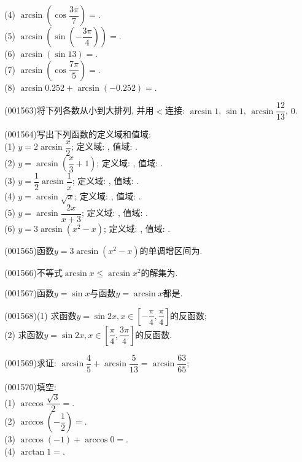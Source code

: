 (4) $\arcsin\left(\cos \dfrac{3\pi}{7}\right)=$.\\ 
(5) $\arcsin\left(\sin\left(-\dfrac{3\pi}{4}\right)\right)=$.\\ 
(6) $\arcsin\left(\sin 13\right)=$.\\ 
(7) $\arcsin\left(\cos \dfrac{7\pi}{5}\right)=$.\\ 
(8) $\arcsin 0.252+\arcsin(-0.252)=$.
\item (001563)将下列各数从小到大排列, 并用$<$连接: $\arcsin 1$, $\sin 1$, $\arcsin \dfrac{12}{13}$, $0$.\\ 
\item (001564)写出下列函数的定义域和值域:\\ 
(1) $y=2\arcsin \dfrac{x}{2}$; 定义域: , 值域: .\\ 
(2) $y=\arcsin\left(\dfrac{x}{3}+1\right)$; 定义域: , 值域: .\\ 
(3) $y=\dfrac{1}{2}\arcsin \dfrac{1}{x}$; 定义域: , 值域: .\\ 
(4) $y=\arcsin \sqrt{x}$; 定义域: , 值域: .\\ 
(5) $y=\arcsin \dfrac{2x}{x+3}$; 定义域: , 值域: .\\ 
(6) $y=3\arcsin (x^2-x)$; 定义域: , 值域: .
\item (001565)函数$y=3\arcsin (x^2-x)$的单调增区间为.
\item (001566)不等式$\arcsin x\le \arcsin x^2$的解集为.
\item (001567)函数$y=\sin x$与函数$y=\arcsin x$都是.
\item (001568)(1) 求函数$y=\sin 2x, x\in\left[-\dfrac{\pi}{4},\dfrac{\pi}{4}\right]$的反函数;\\ 
(2) 求函数$y=\sin 2x, x\in\left[\dfrac{\pi}{4},\dfrac{3\pi}{4}\right]$的反函数.
\item (001569)求证: $\arcsin \dfrac{4}{5}+\arcsin \dfrac{5}{13}=\arcsin \dfrac{63}{65}$;
\item (001570)填空:\\ 
(1) $\arccos\dfrac{\sqrt{3}}{2}=$.\\ 
(2) $\arccos\left(-\dfrac{1}{2}\right)=$.\\ 
(3) $\arccos(-1)+\arccos 0=$.\\ 
(4) $\arctan 1=$.\\ 
